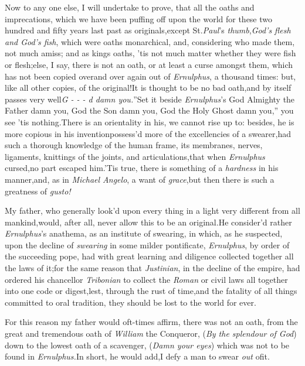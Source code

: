 \documentclass{article}
\begin{document}
Now to any one else, I will undertake\break
to prove, that all the oaths and imprecations, 
which we have been puffing off upon 
the world for these two hundred and 
fifty years last past as originals,\tsh except
St.\@ \textit{Paul}’s \textit{thumb},\tsh \textit{God’s flesh\break
and God’s fish}, which were oaths monarchical, and, considering who made
them, not much amiss; and as kings
oaths, ’tis not much matter whether they
were fish or flesh;\tsh else, I say, there is not an oath, or at least a curse
amongst them, which has not been copied over\break and over again out of
\textit{Ernulphus}, a thousand times: but, like all other copies,
of the original!\tsk It is thought to be no
bad oath,\tsh and by itself passes very
well\tsh \lqq\textit{G\kern 0.05pt
-\kern 0.05pt
-\kern 0.05pt
-\kern 0.05pt d damn you.}”\tsh Set it\break
beside \textit{Ernulphus}’s\tsh
\lqq God Almighty the Father damn you,\tsk
God the Son damn you,\tsk
God the Holy Ghost damn you,”\tsk
you see ’tis nothing.\tsk There
is an orientality in his, we cannot rise up
to: besides, he is more copious in his
invention\tsk possess’d more of the excellencies of a
swearer,\tsh had such a thorough knowledge of the human
frame, its membranes, nerves, ligaments, knittings of the joints,
and articulations,\tsk that when \textit{Ernulphus} cursed,\tsh no
part escaped him.\tsk ’Tis true, there is something of a
\textit{hardness} in his manner,\tsk and, as in \textit{Michael
Angelo}, a want of \textit{grace},\tsh but then there is such a
greatness of \textit{gusto!}\tsk

My father, who generally look’d upon every thing in a
light very different from all mankind,\tsh would, after all, never
allow this to be an original.\tsh He consider’d rather
\textit{Ernulphus}’s anathema, as an institute of swearing, in
which, as he suspected, upon the decline of \textit{swearing} in some
milder pontificate, \textit{Ernulphus}, by order of the succeeding
pope, had with great learning and diligence collected together all
the laws of it;\tsk for the same reason that \textit{Justinian}, in
the decline of the empire, had ordered his chancellor
\textit{Tribonian} to collect the \textit{Roman} or civil laws all
together into one code or digest,\tsh lest, through the
rust of time,\tsh and the fatality of all things committed
to oral tradition, they should be lost to the world for
ever.

For this reason my father would oft-times affirm, there was not
an oath, from the great and tremendous oath of \textit{William} the
Conqueror, (\textit{By the splendour of God}) down to the lowest oath of a
scavenger, (\textit{Damn your eyes}) which was not to be found in
\textit{Ernulphus.}\tsh In short, he would add,\tsk I defy a man
to swear \textit{out} of\break it.
\end{document}
